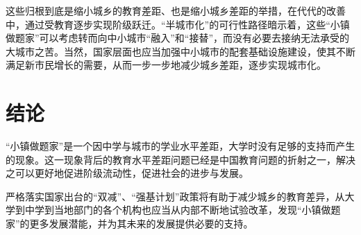 \documentclass[10pt,a4paper,heading=false]{ctexart}
\begin{document}
    这些归根到底是缩小城乡的教育差距、也是缩小城乡差距的举措，在代代的改善中，通过受教育逐步实现阶级跃迁。“半城市化”的可行性路径暗示着，这些“小镇做题家”可以考虑转而向中小城市“融入”和“接替”，而没有必要去接纳无法承受的大城市之苦\cite{paracivil}。当然，国家层面也应当加强中小城市的配套基础设施建设，使其不断满足新市民增长的需要，从而一步一步地减少城乡差距，逐步实现城市化。

    \section{结论}
    “小镇做题家”是一个因中学与城市的学业水平差距，大学时没有足够的支持而产生的现象。这一现象背后的教育水平差距问题已经是中国教育问题的折射之一，解决之可以更好地促进阶级流动性，促进社会的进步与发展。

    严格落实国家出台的“双减”、“强基计划”政策将有助于减少城乡的教育差异，从大学到中学到当地部门的各个机构也应当从内部不断地试验改革，发现“小镇做题家”的更多发展潜能，并为其未来的发展提供必要的支持。

    
\end{document}
